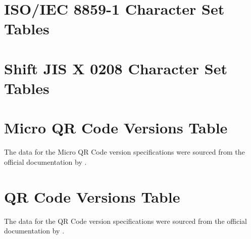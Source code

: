 \documentclass[../2_specs]{subfiles}
\begin{document}
\chapter{ISO/IEC 8859-1 Character Set Tables}
\label{app:ISO-IEC-8859-1}



\chapter{Shift JIS X 0208 Character Set Tables}
\label{app:Shift-JIS-X-0208}



\chapter{Micro QR Code Versions Table}
\label{app:qr-versions-micro}

The data for the Micro QR Code version specifications were sourced from the official documentation by \textcite{denso-wave-qr-versions}.



\chapter{QR Code Versions Table}
\label{app:qr-versions}

The data for the QR Code version specifications were sourced from the official documentation by \textcite{denso-wave-qr-versions}.


\end{document}
